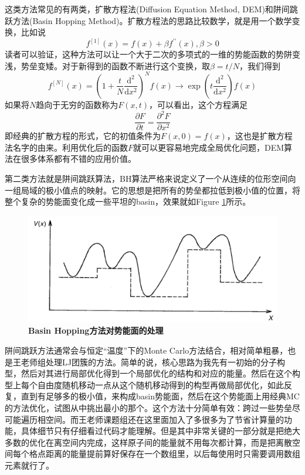 \documentclass[12pt,a4paper,openany,twoside]{book}
\numberwithin{equation}{section}
\newcommand{\ud}{\mathrm{d}}
\begin{document}
        这类方法常见的有两类，扩散方程法(Diffusion Equation Method, DEM)和阱间跳跃方法(Basin Hopping Method)。扩散方程法的思路比较数学，就是用一个数学变换，比如说
        \begin{equation*}
          f^{[1]}(x) = f(x) + \beta f^{\prime \prime}(x), \beta>0
        \end{equation*}
        读者可以验证，这种方法可以让一个大于二次的多项式的一维的势能函数的势阱变浅，势垒变矮。对于新得到的函数不断进行这个变换，取$\beta = t/N$，我们得到
        \begin{equation*}
          f^{[N]}(x) = \left(1+\frac{t}{N}\frac{\ud^2}{\ud x^2}\right)^N f(x)\rightarrow \exp\left(t\frac{\ud^2}{\ud x^2}\right)f(x)
        \end{equation*}
        如果将$N$趋向于无穷的函数称为$F(x,t)$，可以看出，这个方程满足
        \begin{equation*}
          \frac{\partial F}{\partial t} = \frac{\partial^2 F}{\partial x^2}
        \end{equation*}
        即经典的扩散方程的形式，它的初值条件为$F(x,0)=f(x)$，这也是扩散方程法名字的由来。利用优化后的函数$F$就可以更容易地完成全局优化问题，DEM算法在很多体系都有不错的应用价值。

        第二类方法就是阱间跳跃算法，BH算法严格来说定义了一个从连续的位形空间向一组局域的极小值点的映射。它的思想是把所有的势垒都拉低到极小值的位置，将整个复杂的势能面变化成一些平坦的basin，效果就如Figure \ref{BH}所示。
        \begin{figure}
          \centering
          \label{BH}
          \includegraphics[width = 12cm]{fig/BH.jpg}
          \caption{\textbf{Basin Hopping方法对势能面的处理}}
        \end{figure}
        阱间跳跃方法通常会与恒定“温度”下的Monte Carlo方法结合，相对简单粗暴，也是王老师组处理LJ团簇的方法。简单的说，核心思路为我先有一初始的分子构型，然后对其进行局部优化得到一个局部优化的结构和对应的能量。然后在这个构型上每个自由度随机移动一点从这个随机移动得到的构型再做局部优化，如此反复，直到有足够多的极小值，来构成basin势能面，然后在这个势能面上用经典MC的方法优化，试图从中挑出最小的那个。这个方法十分简单有效：跨过一些势垒尽可能遍历相空间。而王老师课题组还在这里面加入了多很多为了节省计算量的功能，具体细节只有仔细看过代码才能理解。但是其中非常关键的一部分就是把绝大多数的优化在离空间内完成，这样原子间的能量就不用每次都计算，而是把离散空间每个格点距离的能量提前算好保存在一个数组里，以后每使用时只需要调用数组元素就行了。
\end{document}
